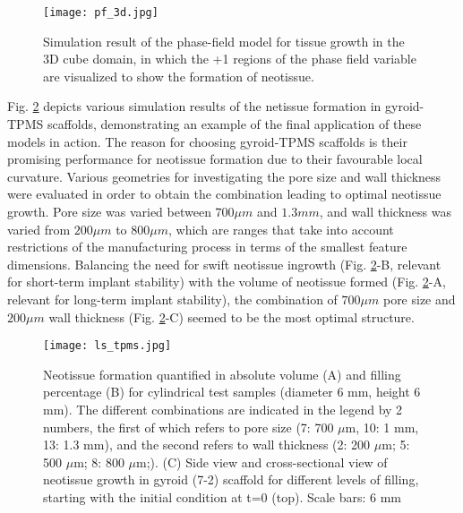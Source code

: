 \begin{figure}
\medskip
\centering
\texttt{[image: pf\_3d.jpg]}
\caption[Simulation result of the phase-field model for tissue growth in the 3D cube domain]{Simulation result of the phase-field model for tissue growth in the 3D cube domain, in which the +1 regions of the phase field variable are visualized to show the formation of neotissue.}
\label{fig:tissue_pf_3d}
\end{figure}

Fig. \ref{fig:tissue_ls_tpms} depicts various simulation results of the netissue formation in gyroid-TPMS scaffolds, demonstrating an example of the final application of these models in action. The reason for choosing gyroid-TPMS scaffolds is their promising performance for neotissue formation due to their favourable local curvature. Various geometries for investigating the pore size and wall thickness were evaluated in order to obtain the combination leading to optimal neotissue growth. Pore size was varied between $700  \mu m$ and $1.3 mm $, and wall thickness was varied from $200 \mu m $ to $800 \mu m$, which are ranges that take into account restrictions of the manufacturing process in terms of the smallest feature dimensions. Balancing the need for swift neotissue ingrowth (Fig. \ref{fig:tissue_ls_tpms}-B, relevant for short-term implant stability) with the volume of neotissue formed (Fig. \ref{fig:tissue_ls_tpms}-A, relevant for long-term implant stability), the combination of $700 \mu m$ pore size and $200 \mu m $ wall thickness (Fig. \ref{fig:tissue_ls_tpms}-C) seemed to be the most optimal structure.

\begin{figure}
\medskip
\centering
\texttt{[image: ls\_tpms.jpg]}
\caption[Simulation results of the level-set model for neotissue formation on TPMS scaffolds]{Neotissue formation quantified in absolute volume (A) and filling percentage (B) for cylindrical test samples (diameter 6 mm, height 6 mm). The different combinations are indicated in the legend by 2 numbers, the first of which refers to pore size (7: 700 $\mu$m, 10: 1 mm, 13: 1.3 mm), and the second refers to wall thickness (2: 200 $\mu$m; 5: 500 $\mu$m; 8: 800 $\mu$m;). (C) Side view and cross-sectional view of neotissue growth in gyroid (7-2) scaffold for different levels of filling, starting with the initial condition at t=0 (top). Scale bars: 6 mm}
\label{fig:tissue_ls_tpms}
\end{figure}

